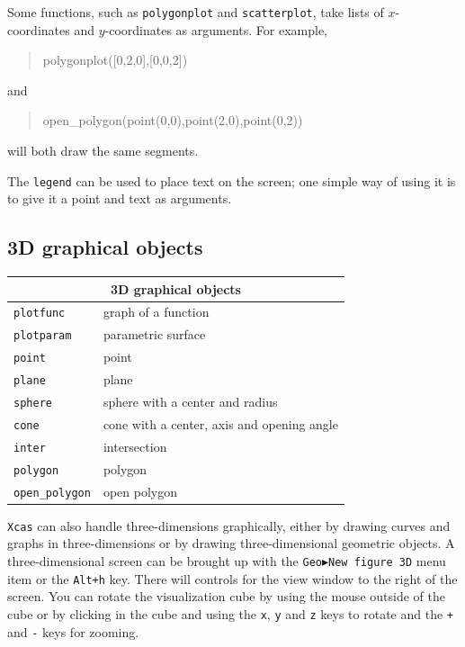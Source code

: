 \documentclass{article}
\newcommand{\xcasin}[1]
{\begin{quote}\ttfamily
#1
\end{quote}}
\begin{document}
Some functions, such as \texttt{polygonplot} and \texttt{scatterplot},
take lists of $x$-coordinates and $y$-coordinates as arguments.  For
example,
\xcasin{polygonplot([0,2,0],[0,0,2])}
and 
\xcasin{open\_polygon(point(0,0),point(2,0),point(0,2))}
will both draw the same segments.

The \texttt{legend} can be used to place text on the screen; one
simple way of using it is to give it a point and text as arguments.


\subsection{3D graphical objects}

\begin{center}
\begin{tabular}{|p{}|p{}|}
\hline
\multicolumn{2}{|c|}{\textbf{3D graphical objects}}\\
\hline\hline
\texttt{plotfunc} & graph of a function\\
\texttt{plotparam} & parametric surface\\
\hline\hline
\texttt{point} & point\\
\texttt{plane} & plane\\
\texttt{sphere} & sphere with a center and radius\\
\texttt{cone} & cone with a center, axis and opening angle\\
\texttt{inter} & intersection \\
\texttt{polygon} & polygon \\
\texttt{open\_polygon} & open polygon\\
\hline
\end{tabular}
\end{center}

\texttt{Xcas} can also handle three-dimensions graphically, either by
drawing curves and graphs in three-dimensions or by drawing
three-dimensional geometric objects.  A three-dimensional screen can
be brought up with the \texttt{Geo$\blacktriangleright$New figure 3D}
menu item or the \texttt{Alt+h} key.
There will controls for the view window to the right of the screen.
You can rotate the visualization cube by using the mouse outside of
the cube or by clicking in the cube and using the \texttt{x},
\texttt{y} and \texttt{z} keys to rotate and the \texttt{+} and
\texttt{-} keys for zooming.
\end{document}
